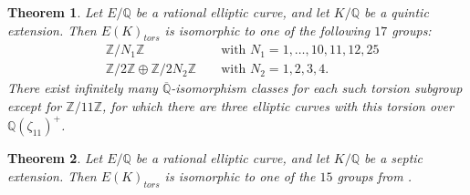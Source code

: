 \documentclass[10pt,leqno]{amsart}
\newcommand{\Z}{\mathbb{Z}}
\newcommand{\Q}{\mathbb{Q}}
\newtheorem{theorem}{Theorem}[]
\theoremstyle{definition}
\theoremstyle{remark}
\numberwithin{theorem}{section}
\begin{document}
\begin{theorem}\cite[Theorem 1]{alvaro-quintic}\label{basechanges5}
    Let $E/\Q$ be a rational elliptic curve, and let $K/\Q$ be a quintic extension. Then $E(K)_{tors}$ is isomorphic to one of the following $17$ groups:
      \begin{align*}
            &\Z/N_1\Z && \text{ with } N_1=1,\ldots,10,11,12,25 \\
            &\Z/2\Z\oplus \Z/2N_2\Z && \text{ with } N_2=1,2,3,4.
        \end{align*}
    There exist infinitely many $\overline{\Q}$-isomorphism classes for each such torsion subgroup except for $\Z/11\Z$, for which there are three elliptic curves with this torsion over $\Q(\zeta_{11})^+$.
\end{theorem}

\begin{theorem}\cite[follows from Proposition 7.7]{basechangesseptic}\label{basechanges7}
   Let $E/\Q$ be a rational elliptic curve, and let $K/\Q$ be a septic extension. Then $E(K)_{tors}$ is isomorphic to one of the $15$ groups from .
\end{theorem}



    




\end{document}
